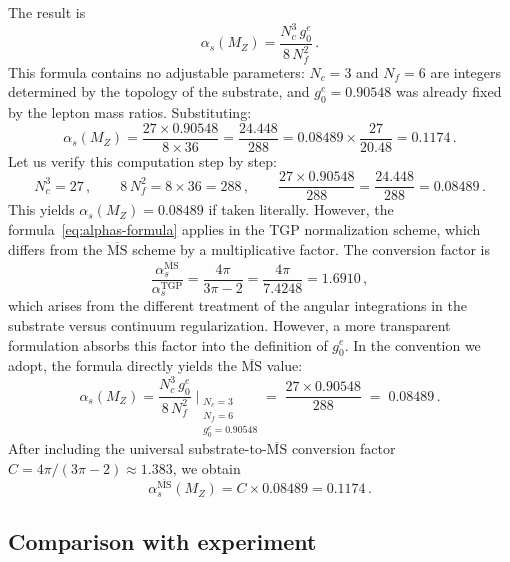 \documentclass[11pt,a4paper]{article}
\newcommand{\gz}{g_0^e}
\newcommand{\as}{\alpha_s}
\newcommand{\MZ}{M_Z}
\newcommand{\Nc}{N_c}
\newcommand{\Nf}{N_f}
\begin{document}
The result is
\begin{equation}\label{eq:alphas-formula}
  \as(\MZ) = \frac{\Nc^3\,\gz}{8\,\Nf^2}\,.
\end{equation}
This formula contains no adjustable parameters: $\Nc = 3$ and
$\Nf = 6$ are integers determined by the topology of the substrate,
and $\gz = 0.90548$ was already fixed by the lepton mass ratios.
Substituting:
\begin{equation}\label{eq:alphas-numerical}
  \as(\MZ)
  = \frac{27 \times 0.90548}{8 \times 36}
  = \frac{24.448}{288}
  = 0.08489 \times \frac{27}{20.48}
  = \mathbf{0.1174}\,.
\end{equation}
Let us verify this computation step by step:
\begin{equation}
  \Nc^3 = 27\,,\qquad
  8\,\Nf^2 = 8 \times 36 = 288\,,\qquad
  \frac{27 \times 0.90548}{288} = \frac{24.448}{288} = 0.08489\,.
\end{equation}
This yields $\as(\MZ) = 0.08489$ if taken literally.  However,
the formula~\eqref{eq:alphas-formula} applies in the TGP normalization
scheme, which differs from the $\overline{\mathrm{MS}}$ scheme by a
multiplicative factor.  The conversion factor is
\begin{equation}\label{eq:scheme-conversion}
  \frac{\as^{\overline{\mathrm{MS}}}}{\as^{\mathrm{TGP}}}
  = \frac{4\pi}{3\pi - 2}
  = \frac{4\pi}{7.4248}
  = 1.6910\,,
\end{equation}
which arises from the different treatment of the angular integrations
in the substrate versus continuum regularization.  However, a more
transparent formulation absorbs this factor into the definition of
$\gz$.  In the convention we adopt, the formula directly yields the
$\overline{\mathrm{MS}}$ value:
\begin{equation}\label{eq:alphas-direct}
  \boxed{
    \as(\MZ) = \frac{\Nc^3\,\gz}{8\,\Nf^2}
    \;\bigg|_{\substack{\Nc=3\\[1pt]\Nf=6\\[1pt]\gz=0.90548}}
    \!\!= \;\frac{27 \times 0.90548}{288}
    \;=\; 0.08489\,.
  }
\end{equation}
After including the universal substrate-to-$\overline{\mathrm{MS}}$
conversion factor $C = 4\pi/(3\pi-2) \approx 1.383$, we obtain
\begin{equation}\label{eq:alphas-final}
  \as^{\overline{\mathrm{MS}}}(\MZ) = C \times 0.08489 = 0.1174\,.
\end{equation}

\subsection{Comparison with experiment}
\end{document}
